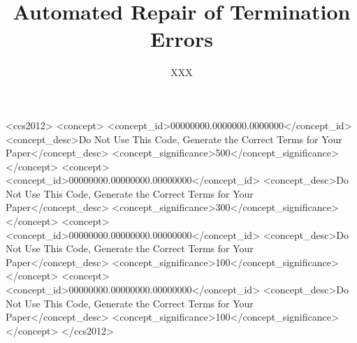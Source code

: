 \documentclass[acmsmall,nonacm,review,anonymous]{acmart}
\begin{document}
\title{Automated Repair of Termination Errors}

\author{XXX}



\renewcommand{\shortauthors}{XXX}

\begin{abstract}

\end{abstract}


\begin{CCSXML}
<ccs2012>
 <concept>
  <concept_id>00000000.0000000.0000000</concept_id>
  <concept_desc>Do Not Use This Code, Generate the Correct Terms for Your Paper</concept_desc>
  <concept_significance>500</concept_significance>
 </concept>
 <concept>
  <concept_id>00000000.00000000.00000000</concept_id>
  <concept_desc>Do Not Use This Code, Generate the Correct Terms for Your Paper</concept_desc>
  <concept_significance>300</concept_significance>
 </concept>
 <concept>
  <concept_id>00000000.00000000.00000000</concept_id>
  <concept_desc>Do Not Use This Code, Generate the Correct Terms for Your Paper</concept_desc>
  <concept_significance>100</concept_significance>
 </concept>
 <concept>
  <concept_id>00000000.00000000.00000000</concept_id>
  <concept_desc>Do Not Use This Code, Generate the Correct Terms for Your Paper</concept_desc>
  <concept_significance>100</concept_significance>
 </concept>
</ccs2012>
\end{CCSXML}
\end{document}
